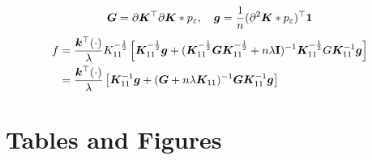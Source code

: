 \[
    {\bm G} = \partial {\bm K}^{\top}\partial {\bm K} * p_{\varepsilon},\quad
    {\bm g} = \frac{1}{n}(\partial^2 {\bm K} * p_{\varepsilon})^{\top}{\bf 1}
\]
\begin{align*}
    f
    &= \frac{{\bm k}^{\top}(\cdot)}{\lambda}K_{11}^{-\frac{1}{2}}
    \left[
        {\bm K}_{11}^{-\frac{1}{2}}{\bm g} + ({\bm K}_{11}^{-\frac{1}{2}}{\bm G}{\bm K}_{11}^{-\frac{1}{2}} + n\lambda {\bf I})^{-1}{\bm K}_{11}^{-\frac{1}{2}}G {\bm K}_{11}^{-1}{\bm g}
    \right]\\
    &= \frac{{\bm k}^{\top}(\cdot)}{\lambda}
    \left[
        {\bm K}_{11}^{-1}{\bm g} + ({\bm G} + n\lambda {\bm K}_{11})^{-1}{\bm G} {\bm K}_{11}^{-1}{\bm g}
    \right]\\
\end{align*}




\section{Tables and Figures}
\label{sec:B}

